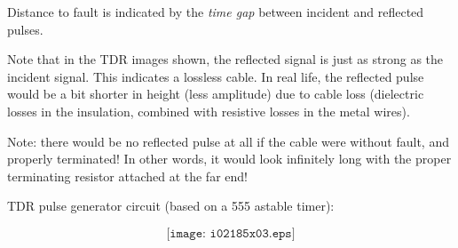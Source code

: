 





Distance to fault is indicated by the {\it time gap} between incident and reflected pulses.







Note that in the TDR images shown, the reflected signal is just as strong as the incident signal.  This indicates a lossless cable.  In real life, the reflected pulse would be a bit shorter in height (less amplitude) due to cable loss (dielectric losses in the insulation, combined with resistive losses in the metal wires).

\vskip 10pt

Note: there would be no reflected pulse at all if the cable were without fault, and properly terminated!  In other words, it would look infinitely long with the proper terminating resistor attached at the far end!

\vskip 10pt

TDR pulse generator circuit (based on a 555 astable timer):

$$\texttt{[image: i02185x03.eps]}$$





